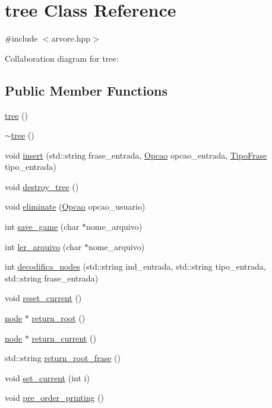 \hypertarget{classtree}{}\section{tree Class Reference}
\label{classtree}


{\ttfamily \#include $<$arvore.\+hpp$>$}



Collaboration diagram for tree\+:
\subsection*{Public Member Functions}
\begin{DoxyCompactItemize}
\item 
\hyperlink{classtree_a9f2a566ac2710fafc31232456780e82d}{tree} ()
\item 
\hyperlink{classtree_a05f3faa3c9a8f6fed237e2d0f6172244}{$\sim$tree} ()
\item 
void \hyperlink{classtree_a9b3882771e4d90c328d621397e3479bf}{insert} (std\+::string frase\+\_\+entrada, \hyperlink{classOpcao}{Opcao} opcao\+\_\+entrada, \hyperlink{classTipoFrase}{Tipo\+Frase} tipo\+\_\+entrada)
\item 
void \hyperlink{classtree_a523172b004801388b1e6920d6d984347}{destroy\+\_\+tree} ()
\item 
void \hyperlink{classtree_a1542d5e7f6dc077a0f79e5f7a2a0f452}{eliminate} (\hyperlink{classOpcao}{Opcao} opcao\+\_\+usuario)
\item 
int \hyperlink{classtree_a0b9f0e908d4486a45645dac81d0e5c94}{save\+\_\+game} (char $\ast$nome\+\_\+arquivo)
\item 
int \hyperlink{classtree_aad4c0668e17990cac8d29a5ab754db6b}{ler\+\_\+arquivo} (char $\ast$nome\+\_\+arquivo)
\item 
int \hyperlink{classtree_a4b8cfb3b938f2289f5a8c44d96f69920}{decodifica\+\_\+nodes} (std\+::string ind\+\_\+entrada, std\+::string tipo\+\_\+entrada, std\+::string frase\+\_\+entrada)
\item 
void \hyperlink{classtree_aa29977d9532142ac24c09b8c91e513aa}{reset\+\_\+current} ()
\item 
\hyperlink{structnode}{node} $\ast$ \hyperlink{classtree_a4fe0fb0307507a56395a377d2166d4d2}{return\+\_\+root} ()
\item 
\hyperlink{structnode}{node} $\ast$ \hyperlink{classtree_a411f2ea2eee1c9849700d543820886b2}{return\+\_\+current} ()
\item 
std\+::string \hyperlink{classtree_a13371a9c50e062c16985d66a36f4b0a8}{return\+\_\+root\+\_\+frase} ()
\item 
void \hyperlink{classtree_a996a9842aeda231f0554d7e49e703cc9}{set\+\_\+current} (int i)
\item 
void \hyperlink{classtree_a7e650b17f6c1e31a527ae3e1b2f3861f}{pre\+\_\+order\+\_\+printing} ()
\end{DoxyCompactItemize}
